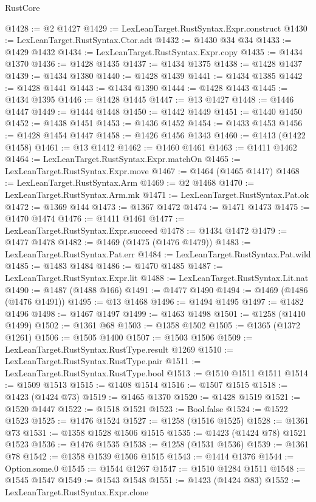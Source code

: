 \begin{lexlean}{RustCore}
\begin{coremodule}
@1428 := @2 @1427
@1429 := LexLeanTarget.RustSyntax.Expr.construct
@1430 := LexLeanTarget.RustSyntax.Ctor.adt
@1432 := @1430 @34 @34
@1433 := @1429 @1432
@1434 := LexLeanTarget.RustSyntax.Expr.copy
@1435 := @1434 @1370
@1436 := @1428 @1435
@1437 := @1434 @1375
@1438 := @1428 @1437
@1439 := @1434 @1380
@1440 := @1428 @1439
@1441 := @1434 @1385
@1442 := @1428 @1441
@1443 := @1434 @1390
@1444 := @1428 @1443
@1445 := @1434 @1395
@1446 := @1428 @1445
@1447 := @13 @1427
@1448 := @1446 @1447
@1449 := @1444 @1448
@1450 := @1442 @1449
@1451 := @1440 @1450
@1452 := @1438 @1451
@1453 := @1436 @1452
@1454 := @1433 @1453
@1456 := @1428 @1454 @1447
@1458 := @1426 @1456 @1343
@1460 := @1413 (@1422 @1458)
@1461 := @13 @1412
@1462 := @1460 @1461
@1463 := @1411 @1462
@1464 := LexLeanTarget.RustSyntax.Expr.matchOn
@1465 := LexLeanTarget.RustSyntax.Expr.move
@1467 := @1464 (@1465 @1417)
@1468 := LexLeanTarget.RustSyntax.Arm
@1469 := @2 @1468
@1470 := LexLeanTarget.RustSyntax.Arm.mk
@1471 := LexLeanTarget.RustSyntax.Pat.ok
@1472 := @1369 @144
@1473 := @1367 @1472
@1474 := @1471 @1473
@1475 := @1470 @1474
@1476 := @1411 @1461
@1477 := LexLeanTarget.RustSyntax.Expr.succeed
@1478 := @1434 @1472
@1479 := @1477 @1478
@1482 := @1469 (@1475 (@1476 @1479))
@1483 := LexLeanTarget.RustSyntax.Pat.err
@1484 := LexLeanTarget.RustSyntax.Pat.wild
@1485 := @1483 @1484
@1486 := @1470 @1485
@1487 := LexLeanTarget.RustSyntax.Expr.lit
@1488 := LexLeanTarget.RustSyntax.Lit.nat
@1490 := @1487 (@1488 @166)
@1491 := @1477 @1490
@1494 := @1469 (@1486 (@1476 @1491))
@1495 := @13 @1468
@1496 := @1494 @1495
@1497 := @1482 @1496
@1498 := @1467 @1497
@1499 := @1463 @1498
@1501 := @1258 (@1410 @1499)
@1502 := @1361 @68
@1503 := @1358 @1502
@1505 := @1365 (@1372 @1261)
@1506 := @1505 @1400
@1507 := @1503 @1506
@1509 := LexLeanTarget.RustSyntax.RustType.result @1269
@1510 := LexLeanTarget.RustSyntax.RustType.pair
@1511 := LexLeanTarget.RustSyntax.RustType.bool
@1513 := @1510 @1511 @1511
@1514 := @1509 @1513
@1515 := @1408 @1514
@1516 := @1507 @1515
@1518 := @1423 (@1424 @73)
@1519 := @1465 @1370
@1520 := @1428 @1519
@1521 := @1520 @1447
@1522 := @1518 @1521
@1523 := Bool.false
@1524 := @1522 @1523
@1525 := @1476 @1524
@1527 := @1258 (@1516 @1525)
@1528 := @1361 @73
@1531 := @1358 @1528 @1506 @1515
@1535 := @1423 (@1424 @78) @1521 @1523
@1536 := @1476 @1535
@1538 := @1258 (@1531 @1536)
@1539 := @1361 @78
@1542 := @1358 @1539 @1506 @1515
@1543 := @1414 @1376
@1544 := Option.some.{0}
@1545 := @1544 @1267
@1547 := @1510 @1284 @1511
@1548 := @1545 @1547
@1549 := @1543 @1548
@1551 := @1423 (@1424 @83)
@1552 := LexLeanTarget.RustSyntax.Expr.clone

\end{coremodule}
\end{lexlean}
